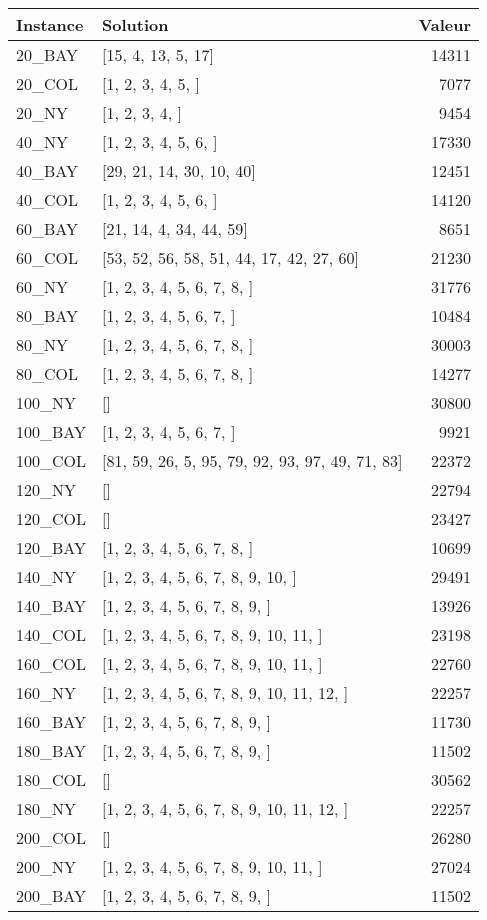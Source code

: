 \documentclass[main.tex]{subfiles}
\begin{document}
\begin{center}
\renewcommand{\arraystretch}{1.4} 
\begin{tabular}{llr}\hline
\textbf{Instance} & \textbf{Solution} & \textbf{Valeur} \\\hline

20\_BAY & [15, 4, 13, 5, 17] & 14311\\
20\_COL & [1, 2, 3, 4, 5, ] & 7077\\
20\_NY & [1, 2, 3, 4, ] & 9454\\
40\_NY & [1, 2, 3, 4, 5, 6, ] & 17330\\
40\_BAY & [29, 21, 14, 30, 10, 40] & 12451\\
40\_COL & [1, 2, 3, 4, 5, 6, ] & 14120\\
60\_BAY & [21, 14, 4, 34, 44, 59] & 8651\\
60\_COL & [53, 52, 56, 58, 51, 44, 17, 42, 27, 60] & 21230\\
60\_NY & [1, 2, 3, 4, 5, 6, 7, 8, ] & 31776\\
80\_BAY & [1, 2, 3, 4, 5, 6, 7, ] & 10484\\
80\_NY & [1, 2, 3, 4, 5, 6, 7, 8, ] & 30003\\
80\_COL & [1, 2, 3, 4, 5, 6, 7, 8, ] & 14277\\
100\_NY & [] & 30800\\
100\_BAY & [1, 2, 3, 4, 5, 6, 7, ] & 9921\\
100\_COL & [81, 59, 26, 5, 95, 79, 92, 93, 97, 49, 71, 83] & 22372\\
120\_NY & [] & 22794\\
120\_COL & [] & 23427\\
120\_BAY & [1, 2, 3, 4, 5, 6, 7, 8, ] & 10699\\
140\_NY & [1, 2, 3, 4, 5, 6, 7, 8, 9, 10, ] & 29491\\
140\_BAY & [1, 2, 3, 4, 5, 6, 7, 8, 9, ] & 13926\\
140\_COL & [1, 2, 3, 4, 5, 6, 7, 8, 9, 10, 11, ] & 23198\\
160\_COL & [1, 2, 3, 4, 5, 6, 7, 8, 9, 10, 11, ] & 22760\\
160\_NY & [1, 2, 3, 4, 5, 6, 7, 8, 9, 10, 11, 12, ] & 22257\\
160\_BAY & [1, 2, 3, 4, 5, 6, 7, 8, 9, ] & 11730\\
180\_BAY & [1, 2, 3, 4, 5, 6, 7, 8, 9, ] & 11502\\
180\_COL & [] & 30562\\
180\_NY & [1, 2, 3, 4, 5, 6, 7, 8, 9, 10, 11, 12, ] & 22257\\
200\_COL & [] & 26280\\
200\_NY & [1, 2, 3, 4, 5, 6, 7, 8, 9, 10, 11, ] & 27024\\
200\_BAY & [1, 2, 3, 4, 5, 6, 7, 8, 9, ] & 11502\\
\hline\end{tabular}
\end{center}
\end{document}
